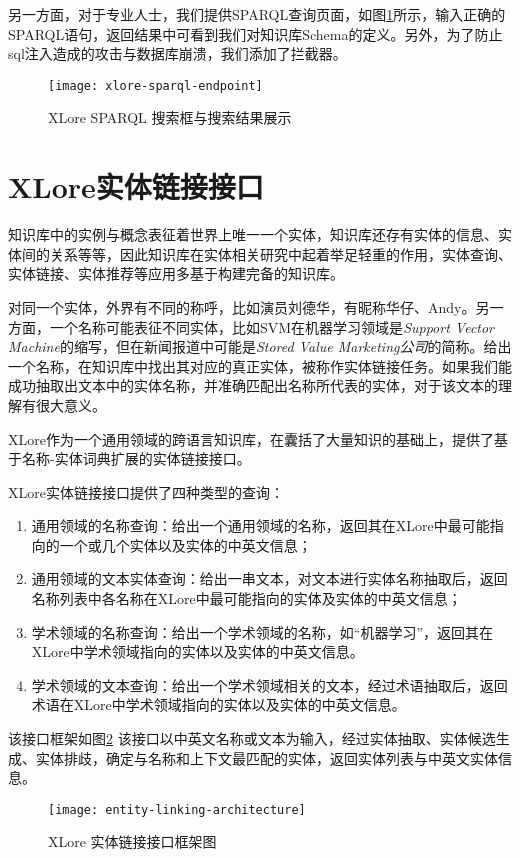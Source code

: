 另一方面，对于专业人士，我们提供SPARQL查询页面，如图\ref{fig:xlore-sparql-endpoint}所示，输入正确的SPARQL语句，返回结果中可看到我们对知识库Schema的定义。另外，为了防止sql注入造成的攻击与数据库崩溃，我们添加了拦截器。

\begin{figure}[H]
  \centering
  \texttt{[image: xlore-sparql-endpoint]}
  \caption{XLore SPARQL 搜索框与搜索结果展示}
  \label{fig:xlore-sparql-endpoint}
\end{figure}

\section{XLore实体链接接口}
\label{sec5:entity-linking-api}

知识库中的实例与概念表征着世界上唯一一个实体，知识库还存有实体的信息、实体间的关系等等，因此知识库在实体相关研究中起着举足轻重的作用，实体查询、实体链接、实体推荐等应用多基于构建完备的知识库。

对同一个实体，外界有不同的称呼，比如演员刘德华，有昵称华仔、Andy。另一方面，一个名称可能表征不同实体，比如SVM在机器学习领域是\textit{Support Vector Machine}的缩写，但在新闻报道中可能是\textit{Stored Value Marketing公司}的简称。给出一个名称，在知识库中找出其对应的真正实体，被称作{\heiti 实体链接}任务。如果我们能成功抽取出文本中的实体名称，并准确匹配出名称所代表的实体，对于该文本的理解有很大意义。

XLore作为一个通用领域的跨语言知识库，在囊括了大量知识的基础上，提供了基于名称-实体词典扩展的实体链接接口。

XLore实体链接接口提供了四种类型的查询：
\begin{enumerate}[1.]
\item 通用领域的名称查询：给出一个通用领域的名称，返回其在XLore中最可能指向的一个或几个实体以及实体的中英文信息；
\item 通用领域的文本实体查询：给出一串文本，对文本进行实体名称抽取后，返回名称列表中各名称在XLore中最可能指向的实体及实体的中英文信息；
\item 学术领域的名称查询：给出一个学术领域的名称，如“机器学习”，返回其在XLore中学术领域指向的实体以及实体的中英文信息。
\item 学术领域的文本查询：给出一个学术领域相关的文本，经过术语抽取后，返回术语在XLore中学术领域指向的实体以及实体的中英文信息。
\end{enumerate}

该接口框架如图\ref{fig:entity-linking-architecture}
该接口以中英文名称或文本为输入，经过实体抽取、实体候选生成、实体排歧，确定与名称和上下文最匹配的实体，返回实体列表与中英文实体信息。
\begin{figure}[H]
  \centering
  \texttt{[image: entity-linking-architecture]}
  \caption{XLore 实体链接接口框架图}
  \label{fig:entity-linking-architecture}
\end{figure}

